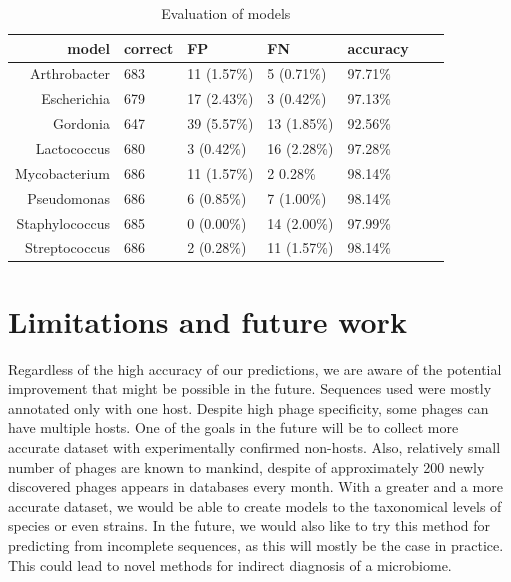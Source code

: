 \begin{table}
  \centering
    \begin{tabular}{ r l l l l l l }
	\hline
	model & correct & FP & FN & accuracy \\
	\hline
	Arthrobacter & 683 & 11 (1.57\%) & 5 (0.71\%) & 97.71\% \\
	Escherichia & 679 & 17 (2.43\%) & 3 (0.42\%) & 97.13\% \\
	Gordonia & 647 & 39 (5.57\%) & 13 (1.85\%) & 92.56\% \\
	Lactococcus & 680 & 3 (0.42\%) & 16 (2.28\%) & 97.28\% \\
	Mycobacterium & 686 & 11 (1.57\%) & 2 0.28\% & 98.14\% \\
	Pseudomonas & 686 & 6 (0.85\%) & 7 (1.00\%) & 98.14\% \\
	Staphylococcus & 685 & 0 (0.00\%) & 14 (2.00\%) & 97.99\% \\
	Streptococcus & 686 & 2 (0.28\%) & 11 (1.57\%) & 98.14\% \\
	\end{tabular}
	\bigskip
    \caption{Evaluation of models}
    \label{tab:models}
\end{table}

\section{Limitations and future work}
Regardless of the high accuracy of our predictions, we are aware of the potential improvement that might be possible in the future.
Sequences used were mostly annotated only with one host.
Despite high phage specificity, some phages can have multiple hosts.
One of the goals in the future will be to collect more accurate dataset with experimentally confirmed non-hosts.
Also, relatively small number of phages are known to mankind, despite of approximately 200 newly discovered phages appears in databases every month.
With a greater and a more accurate dataset, we would be able to create models to the taxonomical levels of species or even strains.
In the future, we would also like to try this method for predicting from incomplete sequences, as this will mostly be  the case in practice.
This could lead to novel methods for indirect diagnosis of a microbiome.

